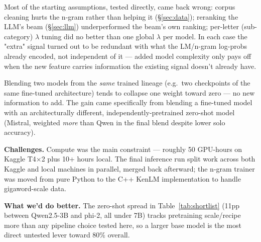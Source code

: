 \documentclass[11pt,conference]{IEEEtran}
\begin{document}
Most of the starting assumptions, tested directly, came back wrong: corpus
cleaning hurts the n-gram rather than helping it (\S\ref{sec:data}); reranking the LLM's
beam (\S\ref{sec:llm}) underperformed the beam's own ranking; per-letter
(sub-category) $\lambda$ tuning did no better than one global $\lambda$ per
model. In each case the "extra" signal turned out to be redundant with what
the LM/n-gram log-probs already encoded, not independent of it --- added
model complexity only pays off when the new feature carries information the
existing signal doesn't already have.

Blending two models from the \emph{same} trained lineage (e.g.\ two
checkpoints of the same fine-tuned architecture) tends to collapse one
weight toward zero --- no new information to add. The gain came specifically
from blending a fine-tuned model with an architecturally different,
independently-pretrained zero-shot model (Mistral, weighted \emph{more} than
Qwen in the final blend despite lower solo accuracy).

\textbf{Challenges.} Compute was the main constraint --- roughly 50 GPU-hours
on Kaggle T4$\times$2 plus 10+ hours local. The final inference run split
work across both Kaggle and local machines in parallel, merged back
afterward; the n-gram trainer was moved from pure Python to the C++ KenLM
implementation to handle gigaword-scale data.

\textbf{What we'd do better.} The zero-shot spread in
Table~\ref{tab:shortlist} (11pp between Qwen2.5-3B and phi-2, all under 7B)
tracks pretraining scale/recipe more than any pipeline choice tested here,
so a larger base model is the most direct untested lever toward 80\% overall.
\end{document}

